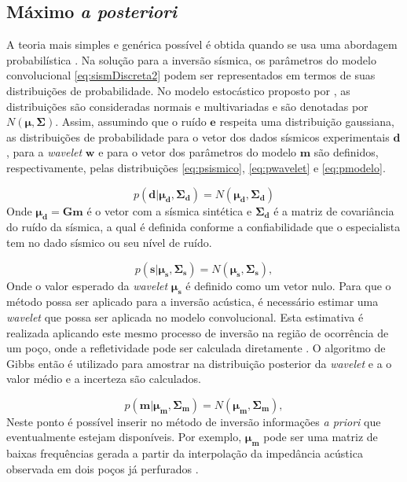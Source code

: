 {\subsection{Máximo \textit{a posteriori}}
\label{sec:map}

A teoria mais simples e genérica possível é obtida quando se usa uma
abordagem probabilística \citep{tarantola}. Na solução para a inversão
sísmica, os parâmetros do modelo convolucional \ref{eq:sismDiscreta2}
podem ser representados em termos de suas distribuições de probabilidade.
No modelo estocástico proposto por \cite{Figueiredo2014}, as distribuições
são consideradas normais e multivariadas e são denotadas por $N(\boldsymbol{\mu},\boldsymbol{\Sigma})$.
Assim, assumindo que o ruído $\boldsymbol{e}$ respeita uma distribuição gaussiana,
as distribuições de probabilidade para o vetor dos dados sísmicos experimentais
$\boldsymbol{d}$, para a \textit{wavelet} $\boldsymbol{w}$ e para
o vetor dos parâmetros do modelo $\boldsymbol{m}$ são
definidos, respectivamente, pelas distribuições \ref{eq:psismico}, \ref{eq:pwavelet} e \ref{eq:pmodelo}.

\begin{equation}
\label{eq:psismico}
p(\boldsymbol{d}|\boldsymbol{\mu_{d}},\boldsymbol{\Sigma_{d}}) =
N(\boldsymbol{\mu_{d}},\boldsymbol{\Sigma_{d}})
\end{equation}
Onde $\boldsymbol{\mu_{d}} = \boldsymbol{Gm}$ é o vetor com a sísmica
sintética e $\boldsymbol{\Sigma_{d}}$ é a matriz de covariância do ruído da
sísmica, a qual é definida conforme a confiabilidade que o especialista tem no
dado sísmico ou seu nível de ruído.

\begin{equation}
\label{eq:pwavelet}
p(\boldsymbol{s}|\boldsymbol{\mu_{s}},\boldsymbol{\Sigma_{s}}) =
N(\boldsymbol{\mu_{s}},\boldsymbol{\Sigma_{s}}),
\end{equation} 
Onde o valor esperado da \textit{wavelet} $\boldsymbol{\mu_{s}}$ é definido
como um vetor nulo. Para que o método possa ser aplicado para a inversão
acústica, é necessário estimar uma \textit{wavelet} que possa ser aplicada
no modelo convolucional. Esta estimativa é realizada aplicando este mesmo processo
de inversão na região de ocorrência de um poço, onde a refletividade pode
ser calculada diretamente \citep{Figueiredo2014}. O algoritmo de
Gibbs então é utilizado para amostrar na distribuição posterior da \textit{wavelet} e a 
o valor médio e a incerteza são calculados.

\begin{equation}
\label{eq:pmodelo}
p(\boldsymbol{m}|\boldsymbol{\mu_{m}},\boldsymbol{\Sigma_{m}}) =
N(\boldsymbol{\mu_{m}},\boldsymbol{\Sigma_{m}}),
\end{equation} 
Neste ponto é possível inserir no método de inversão informações \textit{a priori}
que eventualmente estejam disponíveis. Por exemplo, $\boldsymbol{\mu_{m}}$ pode ser
uma matriz de baixas frequências gerada a partir da interpolação da impedância acústica observada em dois poços
já perfurados \citep{Figueiredo2014}.

}
